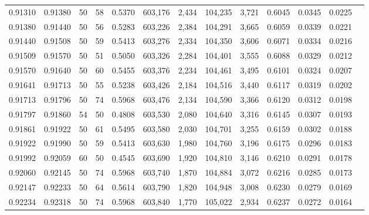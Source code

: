 \begin{tabular}{rrrrrrrrrrrrr}
0.91310 & 0.91380 &    50 &  58 &                                     0.5370 & 603,176 &   2,434 & 104,235 &   3,721 & 0.6045 & 0.0345 & 0.0225 \\
0.91380 & 0.91440 &    50 &  56 &                                     0.5283 & 603,226 &   2,384 & 104,291 &   3,665 & 0.6059 & 0.0339 & 0.0221 \\
0.91440 & 0.91508 &    50 &  59 &                                     0.5413 & 603,276 &   2,334 & 104,350 &   3,606 & 0.6071 & 0.0334 & 0.0216 \\
0.91509 & 0.91570 &    50 &  51 &                                     0.5050 & 603,326 &   2,284 & 104,401 &   3,555 & 0.6088 & 0.0329 & 0.0212 \\
0.91570 & 0.91640 &    50 &  60 &                                     0.5455 & 603,376 &   2,234 & 104,461 &   3,495 & 0.6101 & 0.0324 & 0.0207 \\
0.91641 & 0.91713 &    50 &  55 &                                     0.5238 & 603,426 &   2,184 & 104,516 &   3,440 & 0.6117 & 0.0319 & 0.0202 \\
0.91713 & 0.91796 &    50 &  74 &                                     0.5968 & 603,476 &   2,134 & 104,590 &   3,366 & 0.6120 & 0.0312 & 0.0198 \\
0.91797 & 0.91860 &    54 &  50 &                                     0.4808 & 603,530 &   2,080 & 104,640 &   3,316 & 0.6145 & 0.0307 & 0.0193 \\
0.91861 & 0.91922 &    50 &  61 &                                     0.5495 & 603,580 &   2,030 & 104,701 &   3,255 & 0.6159 & 0.0302 & 0.0188 \\
0.91922 & 0.91990 &    50 &  59 &                                     0.5413 & 603,630 &   1,980 & 104,760 &   3,196 & 0.6175 & 0.0296 & 0.0183 \\
0.91992 & 0.92059 &    60 &  50 &                                     0.4545 & 603,690 &   1,920 & 104,810 &   3,146 & 0.6210 & 0.0291 & 0.0178 \\
0.92060 & 0.92145 &    50 &  74 &                                     0.5968 & 603,740 &   1,870 & 104,884 &   3,072 & 0.6216 & 0.0285 & 0.0173 \\
0.92147 & 0.92233 &    50 &  64 &                                     0.5614 & 603,790 &   1,820 & 104,948 &   3,008 & 0.6230 & 0.0279 & 0.0169 \\
0.92234 & 0.92318 &    50 &  74 &                                     0.5968 & 603,840 &   1,770 & 105,022 &   2,934 & 0.6237 & 0.0272 & 0.0164 \\

\end{tabular}
